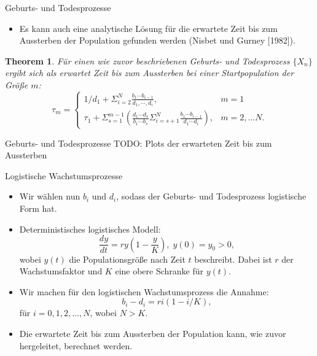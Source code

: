 \documentclass{beamer}
\newtheorem{thm}{Theorem}
\begin{document}
\begin{frame}{Geburts- und Todesprozesse}
  \begin{itemize}
  \item Es kann auch eine analytische Lösung für die erwartete Zeit bis zum Aussterben der Population gefunden werden (Nisbet und Gurney [1982]).
  \end{itemize}
  \begin{thm}
    Für einen wie zuvor beschriebenen Geburts- und Todesprozess $\{X_n\}$ ergibt sich als erwartet Zeit bis zum Aussterben bei einer Startpopulation der Größe $m$:
    \[
      τ_m = \begin{cases}
        1/d_1 + Σ_{i=2}^N \frac{b_1\cdots b_{i-1}}{d_1, \cdots, d_i}, &m = 1 \\
        τ_1 + Σ_{s=1}^{m-1}\left(\frac{d_1\cdots d_s}{b_1\cdots b_s} Σ_{i = s+1}^N \frac{b_1\cdots b_{i-1}}{d_1\cdots d_i}\right), &m = 2, \dots N.
      \end{cases}
    \]
  \end{thm}
\end{frame}
\begin{frame}{Geburts- und Todesprozesse}
  TODO: Plots der erwarteten Zeit bis zum Aussterben
\end{frame}
\begin{frame}{Logistische Wachstumsprozesse}
  \begin{itemize}
  \item Wir wählen nun $b_i$ und $d_i$, sodass der Geburts- und Todesprozess logistische Form hat.
  \item Deterministisches logistisches Modell:
    \[
      \frac{dy}{dt} = ry(1-\frac{y}{K}), \; y(0) = y_0 > 0,
    \]
    wobei $y(t)$ die Populationsgröße nach Zeit $t$ beschreibt. Dabei ist $r$ der Wachstumsfaktor und $K$ eine obere Schranke für $y(t)$.
  \item Wir machen für den logistischen Wachstumsprozess die Annahme:
    \[
      b_i - d_i = ri(1-i/K),
    \]
    für $i=0,1,2,\dots,N$, wobei $N > K$.
  \item Die erwartete Zeit bis zum Aussterben der Population kann, wie zuvor hergeleitet, berechnet werden.
  \end{itemize}
\end{frame}
\end{document}
